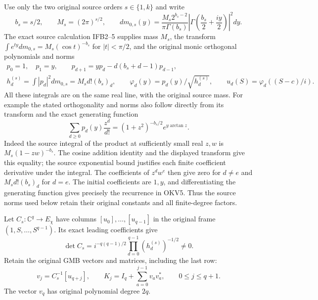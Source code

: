 \documentclass[11pt,a4paper]{article}
\begin{document}
Use only the two original source orders $s\in\{1,k\}$ and write
\[
 b_s=s/2,\qquad M_s=(2\pi)^{s/2},\qquad
 dm_{0,s}(y)=\frac{M_s2^{b_s-2}}{\pi\Gamma(b_s)}
     \left|\Gamma\left(\frac{b_s}{2}+\frac{iy}{2}\right)\right|^2dy.
 \tag{OKV4}
\]
The exact source calculation IFB2--5 supplies mass $M_s$, the transform
$\int e^{ty}dm_{0,s}=M_s(\cos t)^{-b_s}$ for $|t|<\pi/2$, and
the original monic orthogonal polynomials and norms
\[
\begin{gathered}
 p_0=1,\quad p_1=y,\qquad
 p_{d+1}=yp_d-d(b_s+d-1)p_{d-1},\\
 h_d^{(s)}=\int|p_d|^2dm_{0,s}=M_s d!(b_s)_d,\qquad
 \varphi_d(y)=p_d(y)/\sqrt{h_d^{(s)}},\qquad
 u_d(S)=\varphi_d((S-c)/i).
\end{gathered}
 \tag{OKV5}
\]
All these integrals are on the same real line, with the original
source mass. For example the stated orthogonality and norms also
follow directly from its transform and the exact generating function
\[
 \sum_{d\ge0}p_d(y)\frac{z^d}{d!}
       =(1+z^2)^{-b_s/2}e^{y\arctan z}.
\]
Indeed the source integral of the product at sufficiently small real
$z,w$ is $M_s(1-zw)^{-b_s}$. The cosine addition identity and the
displayed transform give this equality; the source exponential bound
justifies each finite coefficient derivative under the integral.
The coefficients of $z^dw^e$ then give zero for $d\ne e$ and
$M_s d!(b_s)_d$ for $d=e$. The initial coefficients are $1,y$,
and differentiating the generating function gives precisely the
recurrence in OKV5. Thus the source norms used below retain their
original constants and all finite-degree factors.

Let $C_s:\mathbb C^q\to E_\chi$ have columns $[u_0],\ldots,[u_{q-1}]$
in the original frame $(1,S,\ldots,S^{q-1})$. Its exact leading
coefficients give
\[
 \det C_s=i^{-q(q-1)/2}\prod_{d=0}^{q-1}(h_d^{(s)})^{-1/2}\ne0.
\]
Retain the original GMB vectors and matrices, including the last row:
\[
 v_j=C_s^{-1}[u_{q+j}],\qquad
 K_j=I_q+\sum_{a=0}^{j-1}v_av_a^*,\qquad 0\le j\le q+1.
 \tag{OKV6}
\]
The vector $v_q$ has original polynomial degree $2q$.
\end{document}
